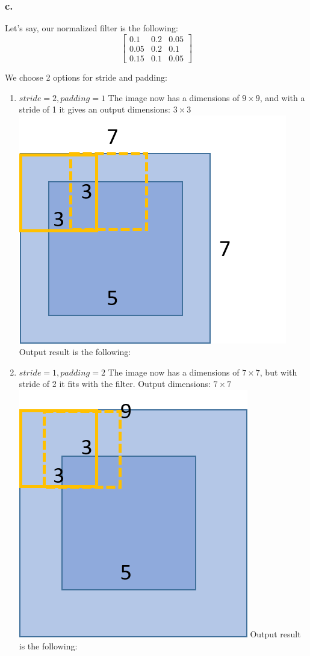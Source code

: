 \documentclass[a4paper]{iacas}
\begin{document}
\subsubsection{c.}
Let's say, our normalized filter is the following:
\begin{equation*}
\left[
\begin{matrix}
0.1 & 0.2 & 0. 05 \\
0.05 & 0.2 & 0.1 \\
0.15 & 0.1 & 0.05
\end{matrix}
\right]
\end{equation*}

We choose 2 options for stride and padding:

\begin{enumerate}
\item $stride = 2, padding = 1$
The image now has a dimensions of $9\times9$, and with a stride of 1 it gives an output dimensions: $3\times3$
\newline
\includegraphics[scale=0.8]{imgs/q_1_31.png}
\newline
Output result is the following:
\item $stride = 1, padding = 2$
The image now has a dimensions of $7\times7$, but with stride of 2 it fits with the filter. Output dimensions: $7\times7$
\newline
\includegraphics[scale=0.8]{imgs/q_1_32.png}
\newline
Output result is the following:
\end{enumerate}
\end{document}
